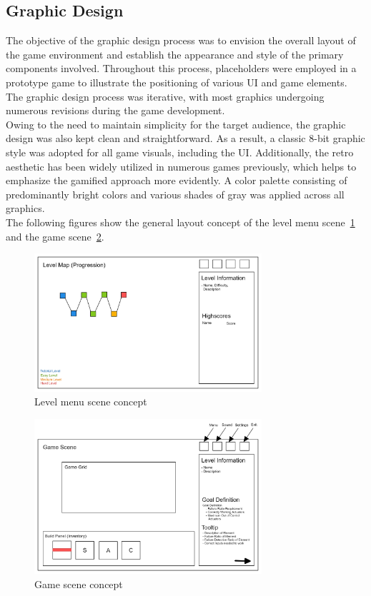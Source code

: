 \subsection{Graphic Design}\label{subsec:graphic-design}
The objective of the graphic design process was to envision the overall layout of the game environment and establish the
appearance and style of the primary components involved.
Throughout this process, placeholders were employed in a prototype game to illustrate the positioning of various \gls{UI} and game elements.
The graphic design process was iterative, with most graphics undergoing numerous revisions during the game development.
\\
Owing to the need to maintain simplicity for the target audience, the graphic design was also kept clean and straightforward.
As a result, a classic 8-bit graphic style was adopted for all game visuals, including the \gls{UI}.
Additionally, the retro aesthetic has been widely utilized in numerous games previously, which helps to emphasize the gamified approach more evidently.
A color palette consisting of predominantly bright colors and various shades of gray was applied across all graphics.
\\
The following figures show the general layout concept of the level
menu scene~\ref{fig:level-menu-scene-concept} and the game scene~\ref{fig:game-scene-concept}.

\begin{figure}
    \includegraphics[width=0.75\textwidth]{Pictures/res/concept/level-menu-scene-concept}
    \caption{Level menu scene concept}
    \label{fig:level-menu-scene-concept}
\end{figure}
\begin{figure}
    \includegraphics[width=0.75\textwidth]{Pictures/res/concept/game-scene-concept}
    \caption{Game scene concept}
    \label{fig:game-scene-concept}
\end{figure}

